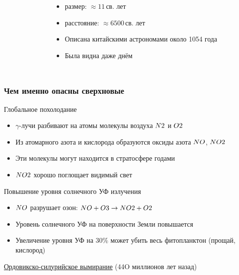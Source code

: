 \documentclass[aspectratio=169]{beamer}
\let\Ch\ch
\let\ch\relax
\begin{document}
\begin{frame}
{\begin{columns}[c]
\begin{figure}
\end{figure}
\begin{itemize}
\item размер: $\approx 11 \, \mathrm{\text{св.~лет}}$
\item расстояние: $\approx 6500 \, \mathrm{\text{св.~лет}}$ 
\item Описана китайскими астрономами около 1054 года
\item Была видна даже днём
\end{itemize}
\end{columns}
}
\end{frame}

\begin{frame}
\frametitle{Чем именно опасны сверхновые}
\begin{block}{Глобальное похолодание}
\begin{itemize}
\item $\gamma$-лучи разбивают на атомы молекулы воздуха $\Ch{N2}$ и $\Ch{O2}$
\item Из атомарного азота и кислорода образуются оксиды азота $\Ch{NO}$, $\Ch{NO2}$
\item Эти молекулы могут находится в стратосфере годами
\item $\Ch{NO2}$ хорошо поглощает видимый свет
\end{itemize}
\end{block}

\begin{block}{Повышение уровня солнечного УФ излучения}
\begin{itemize}
\item $\Ch{NO}$ разрушает озон: $\Ch{NO} + \Ch{O3} \to \Ch{NO2} + \Ch{O2}$
\item Уровень солнечного УФ на поверхности Земли повышается
\item Увеличение уровня УФ на 30\% может убить весь фитопланктон (прощай, кислород)
\end{itemize}
\href{https://руни.рф/index.php/\%D0\%9E\%D1\%80\%D0\%B4\%D0\%BE\%D0\%B2\%D0\%B8\%D0\%BA\%D1\%81\%D0\%BA\%D0\%BE-\%D1\%81\%D0\%B8\%D0\%BB\%D1\%83\%D1\%80\%D0\%B8\%D0\%B9\%D1\%81\%D0\%BA\%D0\%BE\%D0\%B5_\%D0\%B2\%D1\%8B\%D0\%BC\%D0\%B8\%D1\%80\%D0\%B0\%D0\%BD\%D0\%B8\%D0\%B5}{Ордовикско-силурийское вымирание} (44O миллионов лет назад) \cite{arXiv:astro-ph/0309415}
\end{block}
\end{frame}
\end{document}
